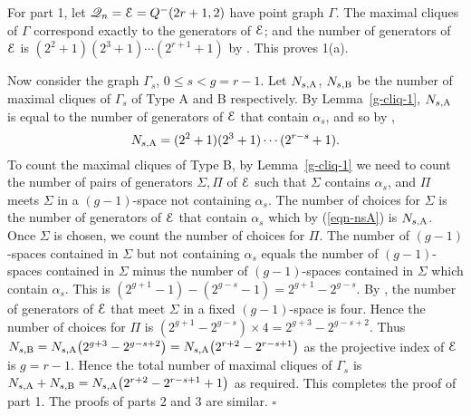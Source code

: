\documentclass[12pt]{article}
\newenvironment{proof}{\noindent{\bf Proof}\hspace{0.5em}}
    { \null  \hfill $\square$ \par}
\newcommand\E{{\cal E}}
\newcommand{\Q}{\mathscr Q}
\begin{document}
\begin{proof} For part 1, let $\Q_n=\E=Q^-(2r+1,2)$ have point graph $\Gamma$. The maximal cliques of $\Gamma$ correspond exactly to the generators of $\E$; and the number  of generators of $\E$ is  $(2^2+1)(2^3+1)\cdots(2^{r+1}+1)$ by \cite[Theorem 22.5.1]{HT}. This proves 1(a).

Now consider the graph $\Gamma_s$, $0\leq s<g=r-1$. Let $N_{s,{\rm A}}$, $N_{s,{\rm B}}$ be  the number of maximal cliques of $\Gamma_s$ of Type A and B respectively. 
By Lemma~\ref{g-cliq-1}, $N_{s,{\rm A}}$ is equal to the number of generators of $\E$ that contain $\alpha_s$, and so by \cite[Theorem 22.4.7]{HT}, 
\begin{equation}\label{eqn-nsA} N_{s,{\rm A}}=(2^2+1)(2^3+1)\cdots(2^{r-s}+1).\end{equation}
To count the maximal cliques of Type B, by Lemma~\ref{g-cliq-1}
we need to count the number of pairs of generators $\Sigma,\Pi$ of $\E$ such that $\Sigma$ contains $\alpha_s$, and $\Pi$ meets $\Sigma$ in a $(g-1)$-space not containing $\alpha_s$.
The number of choices for $\Sigma$ is the number of generators of $\E$ that contain $\alpha_s$ which by (\ref{eqn-nsA}) is $N_{s,{\rm A}}$. Once $\Sigma$ is chosen, we count the number of choices for $\Pi$. The number of $(g-1)$-spaces contained in $\Sigma$ but not containing $\alpha_s$ equals the number of $(g-1)$-spaces contained in $\Sigma$ minus the number of $(g-1)$-spaces contained in $\Sigma$ which contain $\alpha_s$. This is $(2^{g+1}-1)-(2^{g-s}-1)=2^{g+1}-2^{g-s}$. By \cite[Lemma 22.4.8]{HT}, the number of generators of $\E$ that meet $\Sigma$ in a fixed $(g-1)$-space is four. Hence the number of choices for $\Pi$ is  $(2^{g+1}-2^{g-s})\times4=2^{g+3}-2^{g-s+2}$. Thus $N_{s,{\rm B}}=N_{s,{\rm A}}\big(2^{g+3}-2^{g-s+2}\big)= N_{s,{\rm A}}\big(2^{r+2}-2^{r-s+1}\big)$ as the projective index of $\E$ is $g=r-1$. Hence the total number of maximal cliques of $\Gamma_s$ is $N_{s,{\rm A}}+N_{s,{\rm B}}=
N_{s,{\rm A}}\big(2^{r+2}-2^{r-s+1}+1\big)$ as required. This completes the proof of part 1. The proofs of parts 2 and 3 are  similar.
\end{proof}
\end{document}
